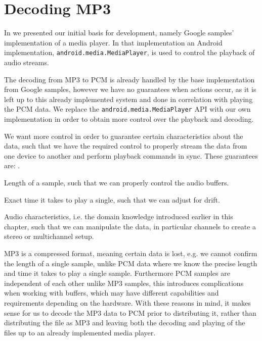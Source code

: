 \section{Decoding MP3}
In  we presented our initial basis for development, namely Google samples' implementation of a media player.
In that implementation an Android implementation, \texttt{android.media.MediaPlayer}, is used to control the playback of audio streams.

The decoding from MP3 to \ac{PCM} is already handled by the base implementation from Google samples, however we have no guarantees when actions occur, as it is left up to this already implemented system and done in correlation with playing the \ac{PCM} data.
We replace the \texttt{android.media.MediaPlayer} API with our own implementation in order to obtain more control over the playback and decoding.

We want more control in order to guarantee certain characteristics about the data, such that we have the required control to properly stream the data from one device to another and perform playback commands in sync.
These guarantees are: .
\begin{eletterate*}
    \item Length of a sample, such that we can properly control the audio buffers.
    \item Exact time it takes to play a single, such that we can adjust for drift.
    \item Audio characteristics, i.e. the domain knowledge introduced earlier in this chapter, such that we can manipulate the data, in particular channels to create a stereo or multichannel setup.
\end{eletterate*}
MP3 is a compressed format, meaning certain data is lost, e.g. we cannot confirm the length of a single sample, unlike \ac{PCM} data where we know the precise length and time it takes to play a single sample.
Furthermore \ac{PCM} samples are independent of each other unlike MP3 samples, this introduces complications when working with buffers, which may have different capabilities and requirements depending on the hardware.
With these reasons in mind, it makes sense for us to decode the MP3 data to \ac{PCM} prior to distributing it, rather than distributing the file as MP3 and leaving both the decoding and playing of the files up to an already implemented media player.
\bigskip

